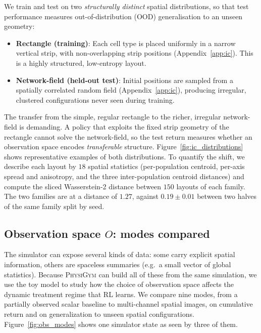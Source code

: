 \documentclass{article}
\newcommand{\physigym}{\textsc{PhysiGym}}
\begin{document}
We train and test on two \emph{structurally distinct} spatial distributions, so that test performance measures out-of-distribution (OOD) generalisation to an unseen geometry:
\begin{itemize}
    \item \textbf{Rectangle (training)}: Each cell type is placed uniformly in a narrow vertical strip, with non-overlapping strip positions (Appendix~\ref{app:ic}). This is a highly structured, low-entropy layout.
    \item \textbf{Network-field (held-out test)}: Initial positions are sampled from a spatially correlated random field (Appendix~\ref{app:ic}), producing irregular, clustered configurations never seen during training.
\end{itemize}
The transfer from the simple, regular rectangle to the richer, irregular network-field is demanding. A policy that exploits the fixed strip geometry of the rectangle cannot solve the network-field, so the test return measures whether an observation space encodes \emph{transferable} structure. Figure~\ref{fig:ic_distributions} shows representative examples of both distributions.
To quantify the shift, we describe each layout by $18$ spatial statistics (per-population centroid, per-axis spread and anisotropy, and the three inter-population centroid distances) and compute the sliced Wasserstein-2 distance between $150$ layouts of each family. The two families are at a distance of $1.27$, against $0.19\pm0.01$ between two halves of the same family split by seed.

\subsection{Observation space $O$: modes compared}
\label{sec:obs}

The simulator can expose several kinds of data: some carry explicit spatial
information, others are spaceless summaries (e.g.\ a small vector of global
statistics). Because \physigym{} can build all of these from the same
simulation, we use the toy model to study how the choice of observation space
affects the dynamic treatment regime that RL learns. We compare nine modes, from
a partially observed scalar baseline to multi-channel spatial images, on
cumulative return and on generalization to unseen spatial configurations.
Figure~\ref{fig:obs_modes} shows one simulator state as seen by three of them.
\end{document}
